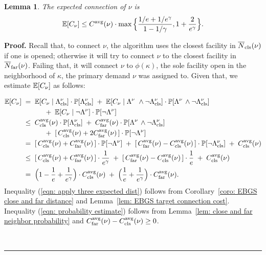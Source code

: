 \documentclass[oneside,final]{ucr}
\newtheorem{lemma}[theorem]{Lemma}
\newenvironment{proof}[1][Proof]{\textbf{#1.} }{\ \rule{0.5em}{0.5em}}
\def\dsp{\def\baselinestretch{2.0}\large\normalsize}
\def\ssp{\def\baselinestretch{1.0}\large\normalsize}
\begin{document}
\begin{lemma}\label{lem: EBGS nu's connection cost}
The expected connection of $\nu$ is
%
\begin{equation*}
\mathbb{E}[C_\nu] \le
  C^{{\mbox{\scriptsize\rm avg}}}(\nu)\cdot\max\Big\{\frac{1/e+1/e^\gamma}{1-1/\gamma}, 1+\frac{2}{e^\gamma}\Big\}.
\end{equation*}
\end{lemma}
\begin{proof}
  Recall that, to connect $\nu$, the algorithm uses the closest facility in
  ${\overline{N}}_{{\mbox{\scriptsize\rm cls}}}(\nu)$ if one is opened; otherwise it will try to connect $\nu$
  to the closest facility in ${\overline{N}}_{{\mbox{\scriptsize\rm far}}}(\nu)$. Failing that, it will
  connect $\nu$ to $\phi(\kappa)$, the sole facility open in the
  neighborhood of $\kappa$, the primary demand $\nu$ was assigned
  to. Given that, we estimate $\mathbb{E}[C_\nu]$ as follows:

\ssp
  \begin{align}
    \mathbb{E}[C_{\nu}] 
		\;&= \;\mathbb{E}[C_{\nu}\mid \Lambda^\nu_{{\mbox{\scriptsize\rm cls}}}] \cdot \mathbb{P}[\Lambda^\nu_{{\mbox{\scriptsize\rm cls}}}]	
				\;+\; \mathbb{E}[C_{\nu}\mid \Lambda^\nu\ \wedge\neg \Lambda^\nu_{{\mbox{\scriptsize\rm cls}}}] 
				\cdot \mathbb{P}[\Lambda^\nu\, \wedge\neg \Lambda^\nu_{{\mbox{\scriptsize\rm cls}}}]	
				\notag
		\\
		& \quad\quad\quad
				+ \; \mathbb{E}[C_{\nu}\mid \neg \Lambda^\nu] \cdot \mathbb{P}[\neg \Lambda^\nu]
				\notag
		\\
		&\leq \; C_{{\mbox{\scriptsize\rm cls}}}^{{\mbox{\scriptsize\rm avg}}}(\nu) \cdot \mathbb{P}[\Lambda^\nu_{{\mbox{\scriptsize\rm cls}}}]
			\;+\; C_{{\mbox{\scriptsize\rm far}}}^{{\mbox{\scriptsize\rm avg}}}(\nu)	
				\cdot \mathbb{P}[\Lambda^\nu\, \wedge\neg \Lambda^\nu_{{\mbox{\scriptsize\rm cls}}}]
                      \label{eqn: apply three expected dist}
						\\
                        &\quad\quad\quad
			+\; [\,C_{{\mbox{\scriptsize\rm cls}}}^{{\mbox{\scriptsize\rm avg}}}(\nu) + 2C_{{\mbox{\scriptsize\rm far}}}^{{\mbox{\scriptsize\rm avg}}}(\nu)\,] \cdot \mathbb{P}[\neg\Lambda^\nu]
		\notag
		\\
                &=\; [\,C_{{\mbox{\scriptsize\rm cls}}}^{{\mbox{\scriptsize\rm avg}}}(\nu) + C_{{\mbox{\scriptsize\rm far}}}^{{\mbox{\scriptsize\rm avg}}}(\nu)\,]\cdot \mathbb{P}[\neg\Lambda^\nu] 
						\;+\; 
							[\,C_{{\mbox{\scriptsize\rm far}}}^{{\mbox{\scriptsize\rm avg}}}(\nu)   -C_{{\mbox{\scriptsize\rm cls}}}^{{\mbox{\scriptsize\rm avg}}}(\nu)\,]
                                \cdot \mathbb{P}[\neg\Lambda^\nu_{{\mbox{\scriptsize\rm cls}}}]
                              \;+\;  C_{{\mbox{\scriptsize\rm cls}}}^{{\mbox{\scriptsize\rm avg}}}(\nu)
                                                        \notag
		\\
             &\leq\; [\,C_{{\mbox{\scriptsize\rm cls}}}^{{\mbox{\scriptsize\rm avg}}}(\nu) + C_{{\mbox{\scriptsize\rm far}}}^{{\mbox{\scriptsize\rm avg}}}(\nu)\,] \cdot \frac{1}{e^\gamma}
             \;+\; [\,C_{{\mbox{\scriptsize\rm far}}}^{{\mbox{\scriptsize\rm avg}}}(\nu) - C_{{\mbox{\scriptsize\rm cls}}}^{{\mbox{\scriptsize\rm avg}}}(\nu)\,] \cdot \frac{1}{e}
             \;+\; C_{{\mbox{\scriptsize\rm cls}}}^{{\mbox{\scriptsize\rm avg}}}(\nu)
             \label{eqn: probability estimate}
             \\
             \notag
             &=\; \Big(1 - \frac{1}{e} + \frac{1}{e^\gamma}\Big)\cdot C_{{\mbox{\scriptsize\rm cls}}}^{{\mbox{\scriptsize\rm avg}}}(\nu)
 				\;+\; \Big(\frac{1}{e} + \frac{1}{e^\gamma}\Big)\cdot C_{{\mbox{\scriptsize\rm far}}}^{{\mbox{\scriptsize\rm avg}}}(\nu).
\end{align}
\dsp
Inequality (\ref{eqn: apply three expected dist}) follows from
Corollary~\ref{coro: EBGS close and far distance} and 
Lemma~\ref{lem: EBGS target connection cost}. 
Inequality (\ref{eqn: probability estimate}) follows from 
Lemma~\ref{lem: close and far neighbor probability} and
$C_{{\mbox{\scriptsize\rm far}}}^{{\mbox{\scriptsize\rm avg}}}(\nu) - C_{{\mbox{\scriptsize\rm cls}}}^{{\mbox{\scriptsize\rm avg}}}(\nu)\ge 0$.


\end{proof}
\end{document}
